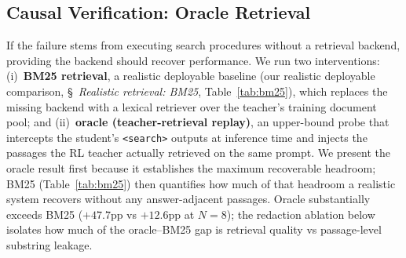 \subsection{Causal Verification: Oracle Retrieval}
\label{sec:causal}

If the failure stems from executing search procedures without a retrieval backend, providing the backend should recover performance. We run two interventions: (i)~\textbf{BM25 retrieval}, a realistic deployable baseline (our realistic deployable comparison, \S~\emph{Realistic retrieval: BM25}, Table~\ref{tab:bm25}), which replaces the missing backend with a lexical retriever over the teacher's training document pool; and (ii)~\textbf{oracle (teacher-retrieval replay)}, an upper-bound probe that intercepts the student's \texttt{<search>} outputs at inference time and injects the passages the RL teacher actually retrieved on the same prompt. We present the oracle result first because it establishes the maximum recoverable headroom; BM25 (Table~\ref{tab:bm25}) then quantifies how much of that headroom a realistic system recovers without any answer-adjacent passages. Oracle substantially exceeds BM25 ($+47.7$pp vs $+12.6$pp at $N{=}8$); the redaction ablation below isolates how much of the oracle--BM25 gap is retrieval quality vs passage-level substring leakage.

